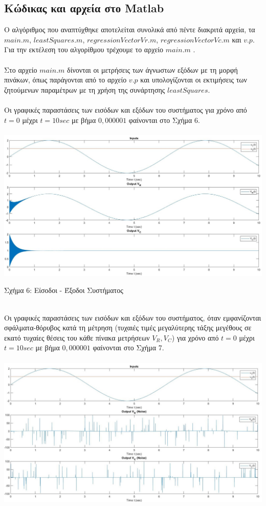 \documentclass[12pt]{article}
\begin{document}
\subsection{Κώδικας και αρχεία στο Matlab}
Ο αλγόριθμος που αναπτύχθηκε αποτελείται συνολικά από πέντε διακριτά αρχεία, τα $main.m$, $leastSquares.m$, $regressionVectorVr.m$,  $regressionVectorVc.m$ και $v.p$. Για την εκτέλεση του αλγορίθμου τρέχουμε το αρχείο $main.m$ .
\\ \\
Στο αρχείο $main.m$ δίνονται οι μετρήσεις των άγνωστων εξόδων με τη μορφή πινάκων, όπως παράγονται από το αρχείο $v.p$ και υπολογίζονται οι εκτιμήσεις των ζητούμενων παραμέτρων με τη χρήση της συνάρτησης $leastSquares$.
\\ \\
Οι γραφικές παραστάσεις των εισόδων και εξόδων του συστήματος για χρόνο από $t=0$  μέχρι $t=10 sec$ με βήμα $0,000001$ φαίνονται στο Σχήμα 6.
\\ \\
\includegraphics[width=\linewidth]{sys2_inp_out.jpg}
\centerline{Σχήμα 6: Είσοδοι - Έξοδοι Συστήματος}
\newline
\newline
\\
Οι γραφικές παραστάσεις των εισόδων και εξόδων του συστήματος, όταν εμφανίζονται σφάλματα-θόρυβος κατά τη μέτρηση (τυχαιές τιμές μεγαλύτερης τάξης μεγέθους σε εκατό τυχαίες θέσεις του κάθε πίνακα μετρήσεων $V_{R},V_{C}$) για χρόνο από $t=0$  μέχρι $t=10 sec$ με βήμα $0,000001$ φαίνονται στο Σχήμα 7.
\\ \\
\includegraphics[width=\linewidth]{sys2_inp_falseout.jpg}
\end{document}
